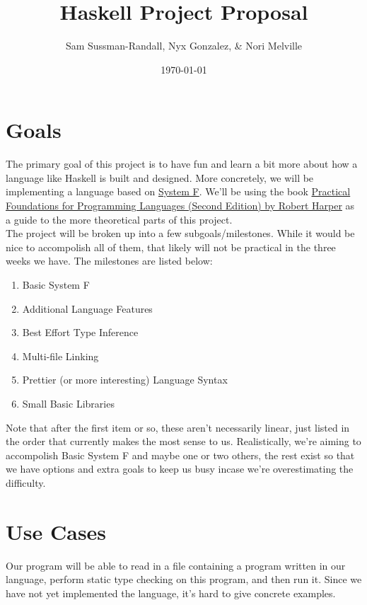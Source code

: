 \documentclass[a4paper,12pt]{article}
\begin{document}
\title{Haskell Project Proposal}
\author{Sam Sussman-Randall, Nyx Gonzalez, \& Nori Melville }
\date{\today}
\maketitle

\section{Goals}

The primary goal of this project is to have fun and learn a bit more about how a language like Haskell is built and designed. More concretely, we will be implementing a language based on \href{https://en.wikipedia.org/wiki/System_F}{System F}. We'll be using the book \href{https://www.cambridge.org/us/universitypress/subjects/computer-science/programming-languages-and-applied-logic/practical-foundations-programming-languages-2nd-edition?format=HB}{Practical Foundations for Programming Languages (Second Edition) by Robert Harper} as a guide to the more theoretical parts of this project.\\

The project will be broken up into a few subgoals/milestones. While it would be nice to accompolish all of them, that likely will not be practical in the three weeks we have. The milestones are listed below:
\begin{enumerate}
    \item Basic System F
    \item Additional Language Features
    \item Best Effort Type Inference
    \item Multi-file Linking
    \item Prettier (or more interesting) Language Syntax
    \item Small Basic Libraries
\end{enumerate}
Note that after the first item or so, these aren't necessarily linear, just listed in the order that currently makes the most sense to us. Realistically, we're aiming to accompolish Basic System F and maybe one or two others, the rest exist so that we have options and extra goals to keep us busy incase we're overestimating the difficulty.

\section{Use Cases}

Our program will be able to read in a file containing a program written in our language, perform static type checking on this program, and then run it. Since we have not yet implemented the language, it's hard to give concrete examples. 
\end{document}
